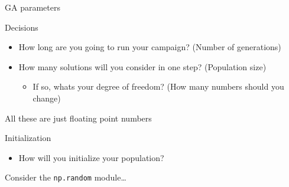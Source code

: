 \documentclass[presentation]{beamer}
\begin{document}
\begin{frame}[label={sec:orgfdc435f},fragile]{GA parameters}
 \begin{block}{Decisions}
\begin{itemize}
\item How long are you going to run your campaign? (Number of generations)
\item How many solutions will you consider in one step? (Population size)
\begin{itemize}
\item If so, whats your degree of freedom? (How many numbers should you change)
\end{itemize}
\end{itemize}
\end{block}
All these are just floating point numbers

\begin{block}{Initialization}
\begin{itemize}
\item How will you initialize your population?
\end{itemize}
\end{block}

Consider the \texttt{np.random} module\ldots{}
\end{frame}
\end{document}
